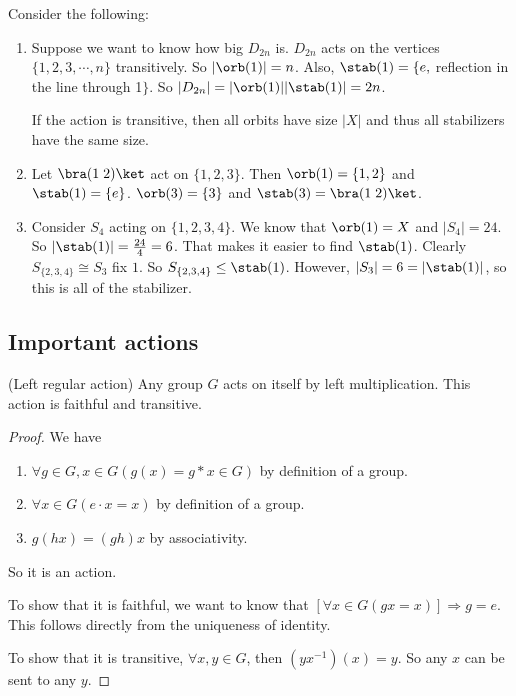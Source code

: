 \documentclass[a4paper]{article}
\begin{document}
\begin{eg}
  Consider the following:
  \begin{enumerate}
    \item Suppose we want to know how big $D_{2n}$ is. $D_{2n}$ acts on the vertices $\{1, 2, 3, \cdots, n\}$ transitively. So $|\orb(1)| = n$. Also, $\stab(1) =\{e, $ reflection in the line through 1$\}$. So $|D_{2n}| = |\orb(1)||\stab(1)| = 2n$.

      \note If the action is transitive, then all orbits have size $|X|$ and thus all stabilizers have the same size.
    \item Let $\bra (1\; 2)\ket$ act on $\{1, 2, 3\}$. Then $\orb(1) = \{1, 2\}$ and $\stab(1) = \{e\}$. $\orb(3) = \{3\}$ and $\stab(3) = \bra(1\; 2)\ket$.
    \item Consider $S_4$ acting on $\{1, 2, 3, 4\}$. We know that $\orb(1) = X$ and $|S_4| = 24$. So $|\stab(1)| = \frac{24}{4} = 6$. That makes it easier to find $\stab(1)$. Clearly $S_{\{2, 3, 4\}} \cong S_3$ fix $1$. So $S_{\{2, 3, 4\}}\leq \stab(1)$. However, $|S_3| = 6 = |\stab(1)|$, so this is all of the stabilizer.
  \end{enumerate}
\end{eg}

\subsection{Important actions}
\begin{lemma}
  (Left regular action) Any group $G$ acts on itself by left multiplication. This action is faithful and transitive.
\end{lemma}
\begin{proof}
  We have
  \begin{enumerate}[label=\arabic{*}.]
    \item $\forall g\in G, x\in G(g(x) = g*x \in G)$ by definition of a group.
    \item $\forall x\in G(e\cdot x = x)$ by definition of a group.
    \item $g(hx) = (gh)x$ by associativity.
  \end{enumerate}
  So it is an action.

  To show that it is faithful, we want to know that $[\forall x\in G(gx = x)]\Rightarrow g = e$. This follows directly from the uniqueness of identity.

  To show that it is transitive, $\forall x, y\in G$, then $(yx^{-1})(x) = y$. So any $x$ can be sent to any $y$.
\end{proof}
\end{document}
